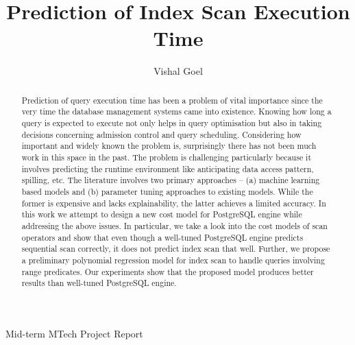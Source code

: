 \documentclass{article}
\title{\large \bf Prediction of Index Scan Execution Time }
\author{Vishal Goel}
\date{}
\begin{document}
	\maketitle
    \begin{center}
        Mid-term MTech Project Report
    \end{center}
        \vskip 12pt
	\thispagestyle{empty}
	
	
	\begin{abstract}
		Prediction of query execution time has been a problem of vital importance since the very time the database management systems came into existence. Knowing how long a query is expected to execute not only helps in query optimisation but also in taking decisions concerning admission control and query scheduling. Considering how important and widely known the problem is, surprisingly there has not been much work in this space in the past. The problem is challenging particularly because it involves predicting the runtime environment like anticipating data access pattern, spilling, etc. The literature involves two primary approaches -- (a) machine learning based models and (b) parameter tuning approaches to existing models. While the former is expensive and lacks explainability, the latter achieves a limited accuracy. In this work we attempt to design a new cost model for PostgreSQL engine while addressing the above issues. In particular, we take a look into the cost models of scan operators and show that even though a well-tuned PostgreSQL engine predicts sequential scan correctly, it does not predict index scan that well. Further, we propose a preliminary polynomial regression model for index scan to handle queries involving range predicates. Our experiments show that the proposed model produces better results than well-tuned PostgreSQL engine.
	\end{abstract}	
	
	\hfill \\
	
\end{document}
